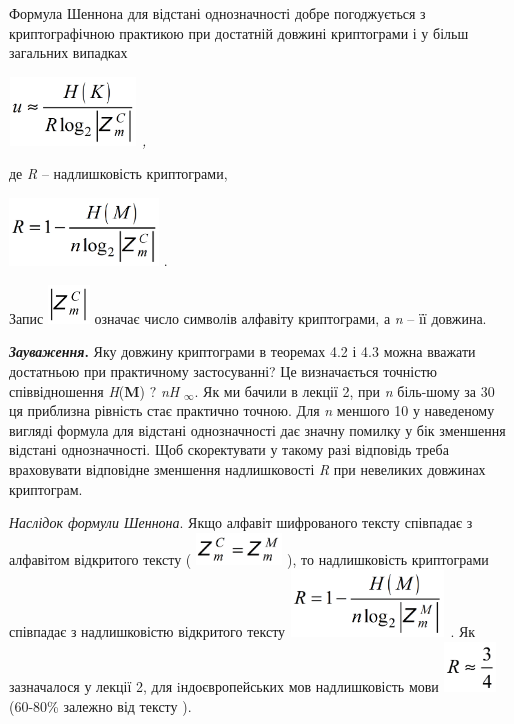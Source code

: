 \documentclass[a4paper]{article}
\newcounter{}
\begin{document}
Формула Шеннона для відстані однозначності добре погоджується з криптографічною
практикою при достатній довжині криптограми  і у більш загальних випадках

{\itshape
 \includegraphics[width=1.3335in,height=0.7189in]{crypt-img/crypt-img45.png} ,}

де \textit{R}\textit{ }– надлишковість криптограми,  

{\centering
 \includegraphics[width=1.5626in,height=0.7118in]{crypt-img/crypt-img46.png} .
\par}

Запис 
\includegraphics[width=0.4374in,height=0.4063in]{crypt-img/crypt-img47.png} 
означає число символів алфавіту криптограми, а \textit{n} – її довжина. 

\textbf{\textit{Зауваження}}\textbf{.} Яку довжину криптограми в теоремах 4.2 і
4.3 можна вважати достатньою при практичному застосуванні? Це визначається
точністю співвідношення  \textit{H}(\textbf{M})  ${?}$\textit{  }\textit{nH}
${{}_{{\infty }}}$. Як ми бачили в лекції 2, при \textit{n} біль-шому за 30 ця
приблизна рівність стає практично точною. Для \textit{n}\textit{ }меншого 10 у
наведеному вигляді формула для відстані однозначності дає значну помилку у бік
зменшення відстані однозначності. Щоб скоректувати у такому разі відповідь
треба враховувати відповідне зменшення надлишковості \textit{R} при невеликих
довжинах криптограм.

\textit{Наслідок формули Шеннона}. Якщо алфавіт шифрованого тексту співпадає з
алфавітом відкритого тексту (
\includegraphics[width=0.9016in,height=0.3339in]{crypt-img/crypt-img48.png} ),
то надлишковість криптограми співпадає з надлишковістю відкритого тексту
\includegraphics[width=1.6252in,height=0.7075in]{crypt-img/crypt-img49.png} . 
Як зазначалося у лекції 2, для iндоєвропейських мов надлишковість мови 
\includegraphics[width=0.5516in,height=0.5209in]{crypt-img/crypt-img50.png}   
(60-80\% залежно від тексту ).
\end{document}
